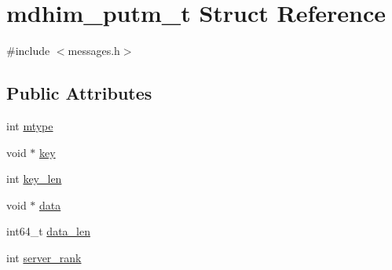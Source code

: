 \hypertarget{structmdhim__putm__t}{\section{mdhim\-\_\-putm\-\_\-t Struct Reference}
\label{d6/dcd/structmdhim__putm__t}
}


{\ttfamily \#include $<$messages.\-h$>$}

\subsection*{Public Attributes}
\begin{DoxyCompactItemize}
\item 
int \hyperlink{structmdhim__putm__t_a632ccc930561029cfbbb28ec2b9929a4}{mtype}
\item 
void $\ast$ \hyperlink{structmdhim__putm__t_a6b5ee783b09f0039b09597e25005396e}{key}
\item 
int \hyperlink{structmdhim__putm__t_afbac7bbcd98d8489c502fbd6599964a0}{key\-\_\-len}
\item 
void $\ast$ \hyperlink{structmdhim__putm__t_a37449dce75af49ca87e00bb51a480b37}{data}
\item 
int64\-\_\-t \hyperlink{structmdhim__putm__t_a91606d5b7d2ef6385d7416abff13bc3c}{data\-\_\-len}
\item 
int \hyperlink{structmdhim__putm__t_ad51fbdc39b6f3f8951b4e87a4f57e3bd}{server\-\_\-rank}
\end{DoxyCompactItemize}


